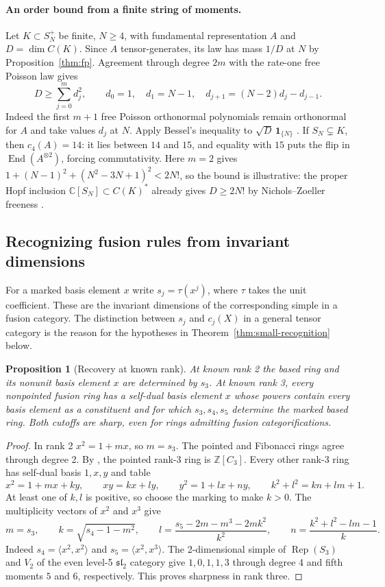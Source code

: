 \documentclass[11pt,reqno]{amsart}
\newtheorem{proposition}[theorem]{Proposition}
\theoremstyle{definition}
\newcommand{\End}{\operatorname{End}}
\newcommand{\CC}{\mathbb C}
\newcommand{\ZZ}{\mathbb Z}
\newcommand{\Rep}{\operatorname{Rep}}
\begin{document}
\paragraph{An order bound from a finite string of moments.}
Let $K\subset S_N^+$ be finite, $N\ge4$, with fundamental representation $A$ and $D=\dim C(K)$. Since $A$ tensor-generates, its law has mass $1/D$ at $N$ by Proposition~\ref{thm:fp}. Agreement through degree $2m$ with the rate-one free Poisson law gives
\[
 D\ge\sum_{j=0}^m d_j^2,\qquad
 d_0=1,\quad d_1=N-1,\quad d_{j+1}=(N-2)d_j-d_{j-1}.
\]
Indeed the first $m+1$ free Poisson orthonormal polynomials remain orthonormal for $A$ and take values $d_j$ at $N$. Apply Bessel's inequality to $\sqrt D\,\mathbf1_{\{N\}}$ \cite[Theorem~9.2]{Simon}. If $S_N\subsetneq K$, then $c_4(A)=14$: it lies between $14$ and $15$, and equality with $15$ puts the flip in $\End(A^{\otimes2})$, forcing commutativity. Here $m=2$ gives $1+(N-1)^2+(N^2-3N+1)^2<2N!$, so the bound is illustrative: the proper Hopf inclusion $\CC[S_N]\subset C(K)^*$ already gives $D\ge2N!$ by Nichols--Zoeller freeness \cite{NZ}.

\subsection{Recognizing fusion rules from invariant dimensions}\label{sec:recognition}
For a marked basis element $x$ write $s_j=\tau(x^j)$, where $\tau$ takes the unit coefficient. These are the invariant dimensions of the corresponding simple in a fusion category. The distinction between $s_j$ and $c_j(X)$ in a general tensor category is the reason for the hypotheses in Theorem~\ref{thm:small-recognition} below.

\begin{proposition}[Recovery at known rank]\label{prop:small-tables}
At known rank 2 the based ring and its nonunit basis element $x$ are determined by $s_3$. At known rank 3, every nonpointed fusion ring has a self-dual basis element $x$ whose powers contain every basis element as a constituent and for which $s_3,s_4,s_5$ determine the marked based ring. Both cutoffs are sharp, even for rings admitting fusion categorifications.
\end{proposition}
\begin{proof}
In rank 2 $x^2=1+mx$, so $m=s_3$. The pointed and Fibonacci rings agree through degree 2. By \cite[Proposition~3.1]{O3}, the pointed rank-3 ring is $\ZZ[C_3]$. Every other rank-3 ring has self-dual basis $1,x,y$ and table
\[
 x^2=1+mx+ky,\qquad xy=kx+ly,\qquad y^2=1+lx+ny,
 \qquad k^2+l^2=kn+lm+1.
\]
At least one of $k,l$ is positive, so choose the marking to make $k>0$. The multiplicity vectors of $x^2$ and $x^3$ give
\[
 m=s_3,\qquad k=\sqrt{s_4-1-m^2},\qquad
 l=\frac{s_5-2m-m^3-2mk^2}{k^2},\qquad
 n=\frac{k^2+l^2-lm-1}{k}.
\]
Indeed $s_4=\langle x^2,x^2\rangle$ and $s_5=\langle x^2,x^3\rangle$. The 2-dimensional simple of $\Rep(S_3)$ and $V_2$ of the even level-5 $\mathfrak{sl}_2$ category give $1,0,1,1,3$ through degree 4 and fifth moments $5$ and $6$, respectively. This proves sharpness in rank three.
\end{proof}
\end{document}
